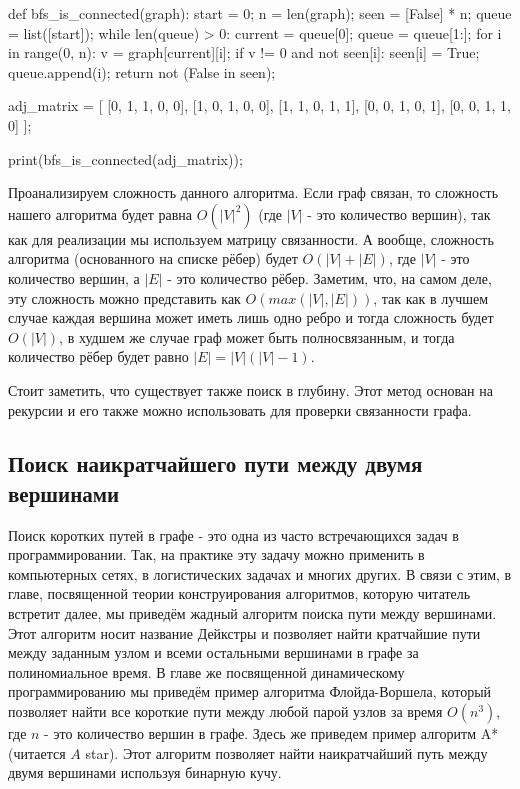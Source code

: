 \begin{python}
def bfs_is_connected(graph):
	start = 0;
	n = len(graph);
	seen = [False] * n;
	queue = list([start]);
	while len(queue) > 0:
		current = queue[0];
		queue = queue[1:];
		for i in range(0, n):
			v = graph[current][i];
			if v != 0 and not seen[i]:
				seen[i] = True;
				queue.append(i);
	return not (False in seen);

adj_matrix = [
	[0, 1, 1, 0, 0],
	[1, 0, 1, 0, 0],
	[1, 1, 0, 1, 1],
	[0, 0, 1, 0, 1],
	[0, 0, 1, 1, 0]
];

print(bfs_is_connected(adj_matrix));
\end{python}

Проанализируем сложность данного алгоритма. Eсли граф связан, 
то сложность нашего алгоритма будет равна $O(|V|^2)$ 
(где $|V|$ - это количество вершин), так как для реализации мы 
используем матрицу связанности. А вообще, сложность алгоритма 
(основанного на списке рёбер) будет $O(|V|+|E|)$, где $|V|$ - это количество 
вершин, а $|E|$ - это количество рёбер. Заметим, что, на самом деле,
эту сложность можно представить как $O(max(|V|, |E|))$, так как 
в лучшем случае каждая вершина может иметь лишь одно ребро и 
тогда сложность будет $O(|V|)$, в худшем же случае граф может 
быть полносвязанным, и тогда количество рёбер будет равно $|E|=|V|(|V|-1)$.

Стоит заметить, что существует также поиск в глубину. 
Этот метод основан на рекурсии и его также можно использовать
для проверки связанности графа. 


\subsection{Поиск наикратчайшего пути между двумя вершинами}

Поиск коротких путей в графе - это одна из часто встречающихся 
задач в программировании. Так, на практике эту задачу можно применить 
в компьютерных сетях, в логистических задачах и многих других.
В связи с этим, в главе, посвященной теории конструирования алгоритмов, 
которую читатель встретит далее, мы приведём 
жадный алгоритм поиска пути между вершинами.
Этот алгоритм носит название Дейкстры и позволяет 
найти кратчайшие пути между заданным узлом и 
всеми остальными вершинами в графе за полиномиальное время.
В главе же посвященной динамическому программированию
мы приведём пример алгоритма Флойда-Воршела, который 
позволяет найти все короткие пути между любой парой 
узлов за время $O(n^3)$, где $n$ - это количество 
вершин в графе. Здесь же приведем пример 
алгоритм A* (читается $A$ star). Этот алгоритм позволяет 
найти наикратчайший путь между двумя вершинами 
используя бинарную кучу. 

